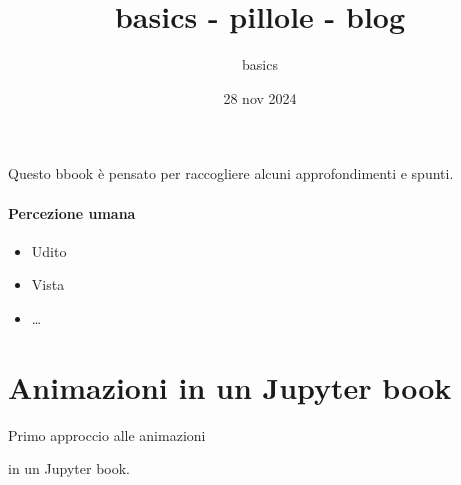 \documentclass[letterpaper,10pt,italian]{jupyterBook}
\title{basics - pillole - blog}
\date{28 nov 2024}
\author{basics}
\begin{document}
\pagestyle{empty}
\sphinxmaketitle
\pagestyle{plain}
\sphinxtableofcontents
\pagestyle{normal}
\label{\detokenize{intro::doc}}


\sphinxAtStartPar
Questo bbook è pensato per raccogliere alcuni approfondimenti e spunti.
\subsubsection*{Percezione umana}
\begin{itemize}
\item {} 
\sphinxAtStartPar
Udito

\item {} 
\sphinxAtStartPar
Vista

\item {} 
\sphinxAtStartPar
…

\end{itemize}



\sphinxstepscope


\chapter{Animazioni in un Jupyter book}
\label{\detokenize{ch/animations:animazioni-in-un-jupyter-book}}\label{\detokenize{ch/animations::doc}}
\sphinxAtStartPar
Primo approccio alle animazioni%
\begin{footnote}[1]\sphinxAtStartFootnote
{}
%
\end{footnote} in un Jupyter book.
\end{document}
